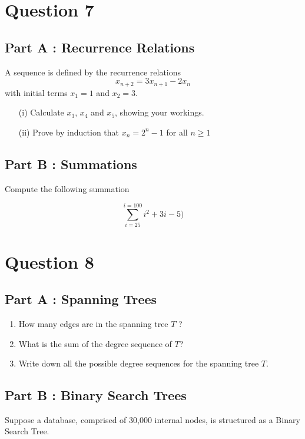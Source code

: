 \documentclass[12pt]{report}
\begin{document}
\section*{Question 7}
\subsection*{Part A : Recurrence Relations}
A sequence is defined by the recurrence relations
 \[x_{n+2}  = 3x_{n+1} - 2x_n\]
with initial terms $x_1 = 1$ and $x_2=3$.

\begin{itemize}
\item[(i)] Calculate $x_3$, $x_4$ and $x_5$, showing your workings.
\item[(ii)] Prove by induction that $x_n = 2^n - 1$ for all $n \geq 1$
\end{itemize}

\subsection*{Part B : Summations}

Compute the following summation

\[ \sum^{i=100}_{i=25} i^2 + 3i -5)\]
\section*{Question 8}
\subsection*{Part A : Spanning Trees}
\begin{enumerate}
\item How many edges are in the spanning tree $T$ ?
\item What is the sum of the degree sequence of $T$?
\item Write down all the possible degree sequences for the spanning tree $T$.
\end{enumerate}

\subsection*{Part B : Binary Search Trees}
Suppose a database, comprised of 30,000 internal nodes, is structured as a Binary Search Tree.
\end{document}
